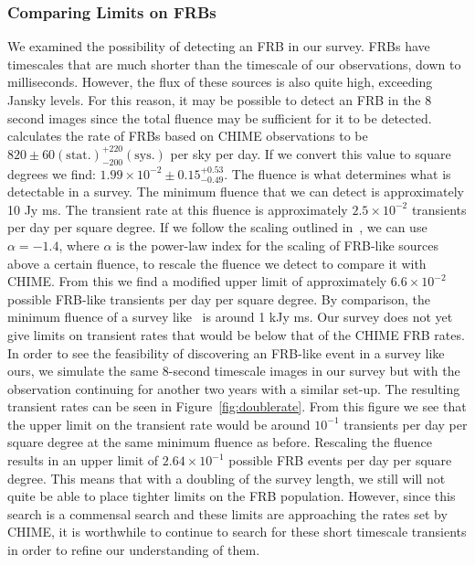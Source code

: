 \documentclass[12pt]{article}
\begin{document}
\subsubsection{Comparing Limits on FRBs}
We examined the possibility of detecting an FRB in our survey. FRBs have timescales that are much shorter than the timescale of our observations, down to milliseconds. However, the flux of these sources is also quite high, exceeding Jansky levels. For this reason, it may be possible to detect an FRB in the 8 second images since the total fluence may be sufficient for it to be detected. \citet{2021ApJS..257...59C} calculates the rate of FRBs based on CHIME observations to be $820\pm 60 (\text{stat.})_{-200}^{+220}(\text{sys.})$ per sky per day. If we convert this value to square degrees we find: $1.99\times10^{-2}\pm0.15_{-0.49}^{+0.53}$. The fluence is what determines what is detectable in a survey. The minimum fluence that we can detect is approximately 10 Jy ms. The transient rate at this fluence is approximately $2.5\times10^{-2}$ transients per day per square degree.  If we follow the scaling outlined in~\citet{2021ApJS..257...59C}, we can use $\alpha=-1.4$, where $\alpha$ is the power-law index for the scaling of FRB-like sources above a certain fluence, to rescale the fluence we detect to compare it with CHIME. From this we find a modified upper limit of approximately $6.6\times10^{-2}$  possible FRB-like transients per day per square degree. By comparison, the minimum fluence of a survey like~\citet{2011ApJ...728L..14B} is around 1 kJy ms. Our survey does not yet give limits on transient rates that would be below that of the CHIME FRB rates. In order to see the feasibility of discovering an FRB-like event in a survey like ours, we simulate the same 8-second timescale images in our survey but with the observation continuing for another two years with a similar set-up. The resulting transient rates can be seen in Figure~\ref{fig:doublerate}. From this figure we see that the upper limit on the transient rate would be around $10^{-1}$ transients per day per square degree at the same minimum fluence as before. Rescaling the fluence results in an upper limit of $2.64\times 10^{-1}$ possible FRB events per day per square degree. This means that with a doubling of the survey length, we still will not quite be able to place tighter limits on the FRB population. However, since this search is a commensal search and these limits are approaching the rates set by CHIME, it is worthwhile to continue to search for these short timescale transients in order to refine our understanding of them.
\end{document}
